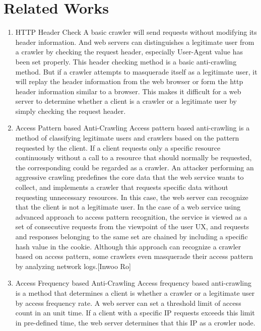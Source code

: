 \documentclass[sigconf,anonymous=false]{acmart}
\begin{document}
%
%
\section{Related Works}
\begin{enumerate}

\item HTTP Header Check
\newline A basic crawler will send requests without modifying its header information. And web servers can distinguishes a legitimate user from a crawler by checking the request header, especially User-Agent value has been set properly. This header checking method is a basic anti-crawling method.
But if a crawler attempts to masquerade itself as a legitimate user, it will replay the header information from the web browser or form the http header information similar to a browser. This makes it difficult for a web server to determine whether a client is a crawler or a legitimate user by simply checking the request header.
\newline

\item Access Pattern based Anti-Crawling
\newline
Access pattern based anti-crawling is a method of classifying legitimate users and crawlers based on the pattern requested by the client. If a client requests only a specific resource continuously without a call to a resource that should normally be requested, the corresponding could be regarded as a crawler. 
An attacker performing an aggressive crawling predefines the core data that the web service wants to collect, and implements a crawler that requests specific data without requesting unnecessary resources. In this case, the web server can recognize that the client is not a legitimate user.
In the case of a web service using advanced approach to access pattern recognition, the service is viewed as a set of consecutive requests from the viewpoint of the user UX, and requests and responses belonging to the same set are chained by including a specific hash value in the cookie.
Although this approach can recognize a crawler based on access pattern, some crawlers even masquerade their access pattern by analyzing network logs.[Inwoo Ro] 
\newline 
\item Access Frequency based Anti-Crawling
\newline 
Access frequency based anti-crawling is a method that determines a client is whether a crawler or a legitimate user by access frequency rate. A web server can set a threshold limit of access count in an unit time. If a client with a specific IP requests exceeds this limit in pre-defined time, the web server determines that this IP as a crowler node.


\end{enumerate}
\end{document}
